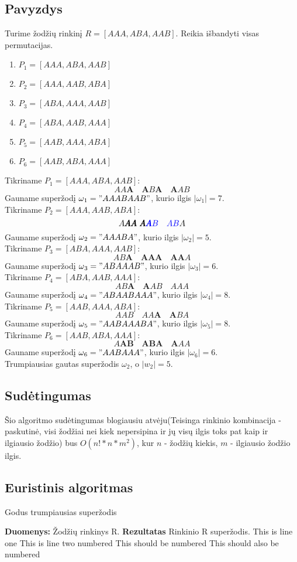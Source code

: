 \documentclass{VUMIFInfKursinis}
\begin{document}
\subsection{Pavyzdys}
Turime žodžių rinkinį $R=[AAA, ABA, AAB]$. Reikia išbandyti visas permutacijas. 
\begin{enumerate}
  \item{$P_1 =[AAA, ABA, AAB]$}
  \item{$P_2 =[AAA, AAB, ABA]$}
  \item{$P_3 =[ABA, AAA, AAB]$}
  \item{$P_4 =[ABA, AAB, AAA]$}
  \item{$P_5 =[AAB, AAA, ABA]$}
  \item{$P_6 =[AAB, ABA, AAA]$}
\end{enumerate}
Tikriname $P_1 =[AAA, ABA, AAB]$:
\[AA\pmb{A}\quad{}\pmb{A}B\pmb{A}\quad{}\pmb{A}AB\]
Gauname superžodį $\omega{}_1 = "AAABAAB"$, kurio ilgis $|\omega{}_1| = 7$.\\
Tikriname $P_2 =[AAA, AAB, ABA]$:
\[A\pmb{AA} ~ \pmb{A\textcolor{blue}{A}}\textcolor{blue}{B} \quad{} \textcolor{blue}{AB}A\]
Gauname superžodį $\omega{}_2 = "AAABA"$, kurio ilgis $|\omega{}_2| = 5$.\\
Tikriname $P_3 =[ABA, AAA, AAB]$:
\[AB\pmb{A}\quad{}\pmb{A}\pmb{AA}\quad{}\pmb{AA}A\]
Gauname superžodį $\omega{}_3 = "ABAAAB"$, kurio ilgis $|\omega{}_3| = 6$.\\
Tikriname $P_4 =[ABA, AAB, AAA]$:
\[AB\pmb{A}\quad{}\pmb{A}AB\quad{}AAA\]
Gauname superžodį $\omega{}_4 = "ABAABAAA"$, kurio ilgis $|\omega{}_4| = 8$.\\
Tikriname $P_5 =[AAB, AAA, ABA]$:
\[AAB\quad{}AA\pmb{A}\quad{}\pmb{A}BA\]
Gauname superžodį $\omega{}_5 = "AABAAABA"$, kurio ilgis $|\omega{}_5| = 8$.\\
Tikriname $P_6 =[AAB, ABA, AAA]$:
\[A\pmb{AB}\quad{}\pmb{AB}\pmb{A}\quad{}\pmb{A}AA\]
Gauname superžodį $\omega{}_6 = "AABAAA"$, kurio ilgis $|\omega{}_6| = 6$.\\
Trumpiausias gautas superžodis $\omega{}_2$, o $|w_2|=5$.

\subsection{Sudėtingumas}
Šio algoritmo sudėtingumas blogiausiu atvėju(Teisinga rinkinio kombinacija - paskutinė, visi žodžiai nei kiek nepersipina ir jų visų ilgis toks pat kaip ir ilgiausio žodžio) bus $O(n! * n * m^2)$, kur $n$ - žodžių kiekis, $m$ - ilgiausio žodžio ilgis.

\subsection{Euristinis algoritmas}

\renewcommand{\algorithmcfname}{Algoritmas}

\begin{algorithm}
  \caption{Godus trumpiausias superžodis}
  \DontPrintSemicolon
  \textbf{Duomenys:} Žodžių rinkinys R. \;
  \textbf{Rezultatas} Rinkinio R superžodis. \;
  This is line one \;
  This is line two numbered \;
  This should be numbered \;
  This should also be numbered
\end{algorithm}
\end{document}
